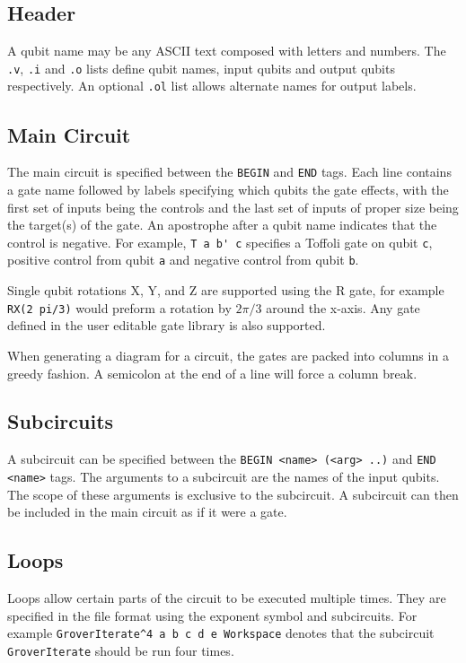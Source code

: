 \documentclass[a4paper,UKenglish]{lipics}
\begin{document}
\subsection{Header}
A qubit name may be any ASCII text composed with letters and numbers. 
The \verb+.v+, \verb+.i+ and \verb+.o+ lists define qubit names, input qubits and output qubits respectively.
An optional \verb+.ol+ list allows alternate names for output labels.

\subsection{Main Circuit}
The main circuit is specified between the \verb+BEGIN+ and \verb+END+ tags.
Each line contains a gate name followed by labels specifying which qubits the gate effects, with the first set of inputs being the controls and the last set of inputs of proper size being the target(s) of the gate.
An apostrophe after a qubit name indicates that the control is negative. 
For example, \verb+T a b' c+ specifies a Toffoli gate on qubit \verb+c+, positive control from qubit \verb+a+ and negative control from qubit \verb+b+. 

Single qubit rotations X, Y, and Z are supported using the R gate, for example \verb+RX(2 pi/3)+ would preform a rotation by $2\pi/3$ around the x-axis. 
Any gate defined in the user editable gate library is also supported.

When generating a diagram for a circuit, the gates are packed into columns in a greedy fashion. 
A semicolon at the end of a line will force a column break.

\subsection{Subcircuits}
A subcircuit can be specified between the \verb+BEGIN <name> (<arg> ..)+ and \verb+END <name>+ tags.
The arguments to a subcircuit are the names of the input qubits.
The scope of these arguments is exclusive to the subcircuit.
A subcircuit can then be included in the main circuit as if it were a gate.

\subsection{Loops}
Loops allow certain parts of the circuit to be executed multiple times. 
They are specified in the file format using the exponent symbol and subcircuits.
For example \verb+GroverIterate^4 a b c d e Workspace+ denotes that the subcircuit \verb+GroverIterate+ should be run four times.
\end{document}
